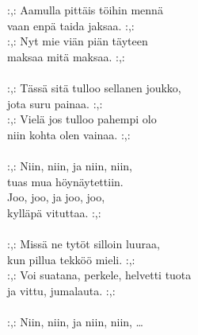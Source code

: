 
            :,: Aamulla pittäis töihin mennä \\
            vaan enpä taida jaksaa. :,: \\
            :,: Nyt mie viän piän täyteen \\
            maksaa mitä maksaa. :,: \\
\hspace{10mm} \\
            :,: Tässä sitä tulloo sellanen joukko, \\
            jota suru painaa. :,: \\
            :,: Vielä jos tulloo pahempi olo \\
            niin kohta olen vainaa. :,: \\
\hspace{10mm} \\
            :,: Niin, niin, ja niin, niin, \\
            tuas mua höynäytettiin. \\
            Joo, joo, ja joo, joo, \\
            kylläpä vituttaa. :,: \\
\hspace{10mm} \\
            :,: Missä ne tytöt silloin luuraa, \\
            kun pillua tekköö mieli. :,: \\
            :,: Voi suatana, perkele, helvetti tuota \\
            ja vittu, jumalauta. :,: \\
\hspace{10mm} \\
            :,: Niin, niin, ja niin, niin, … \\
